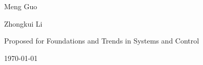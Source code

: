 \begin{titlepage}
  \centering
  \vspace*{2cm}

  {\Huge\bfseries \booktitle \par}
  \vspace{1.5cm}

  {\Large Meng Guo \par}
  \vspace{0.3cm}
  {\Large Zhongkui Li \par}

  \vfill

  {\large Proposed for Foundations and Trends in Systems and Control\par}


  \vfill

  {\large \today\par}
\end{titlepage}
